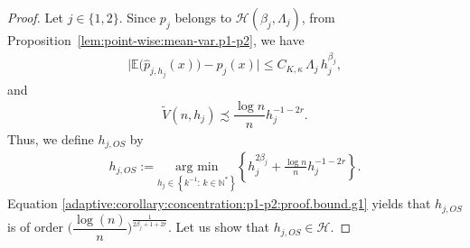 \documentclass[11pt,a4paper,openany]{article}
\def\N{\mathbb{N}}
\def\r{{r}}
\begin{document}
\begin{proof}%
Let  $j\in\{1,2\}$.
	Since $p_{j}$ belongs to $\mathcal{H}(\beta_{j}, \Lambda_{j})$, from  Proposition~\ref{lem:point-wise:mean-var.p1-p2},  we have
	\begin{align*}
		\Big| \mathbb{E}\big(\widehat{p}_{j , h_{j} }(x)\big) - p_{j}(x) \Big|  
		\leq     C_{K,\mathcal{\kappa}} \,  \Lambda_{j} \,  h_{j}^{\beta_{j}}  ,    
	\end{align*}
and
	\begin{align*}
		\widetilde V(n,h_{j})  \precsim    \dfrac{    \log n  }{n} h_{j}^{-1 - 2\r}  .  
	\end{align*}
	Thus, we define $h_{j,OS}$ by    
	\begin{align}
		h_{j,OS} := \underset{h_{j} \in \left\{k^{-1} :\, k \in \N^{*}  \right\} %
		}{\textrm{arg min}}  \left\{   h_{j}^{2 \beta_{j}}  +    \frac{\log n }{n} h_{j}^{-1 - 2\r}     \right\} .  
		\label{adaptive:corollary:concentration:p1-p2:proof.bound.g1}
	\end{align}
	Equation \eqref{adaptive:corollary:concentration:p1-p2:proof.bound.g1} yields that $h_{j,OS} $ is of order $\Big( \dfrac{\log(n)}{n} \Big)^{\frac{1}{2 \beta_{j} + 1 + 2r }}  $. Let us show that $h_{j,OS} \in  \mathcal{H}$. 


\end{proof}
\end{document}
